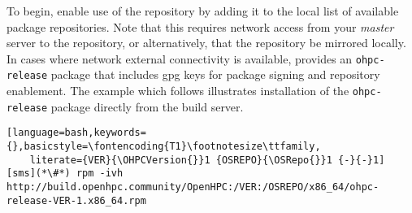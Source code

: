 To begin, enable use of the \OHPC{} repository by adding it to the local list
of available package repositories. Note that this requires network access from
your {\em master} server to the \OHPC{} repository, or alternatively, that
the \OHPC{} repository be mirrored locally.  In cases where network external
connectivity is available, \OHPC{} provides an \texttt{ohpc-release} package
that includes gpg keys for package signing and repository enablement.  The
example which follows illustrates installation of the \texttt{ohpc-release}
package directly from the \OHPC{} build server.


\begin{lstlisting}[language=bash,keywords={},basicstyle=\fontencoding{T1}\footnotesize\ttfamily,
	literate={VER}{\OHPCVersion{}}1 {OSREPO}{\OSRepo{}}1 {-}{-}1]
[sms](*\#*) rpm -ivh http://build.openhpc.community/OpenHPC:/VER:/OSREPO/x86_64/ohpc-release-VER-1.x86_64.rpm
\end{lstlisting}







